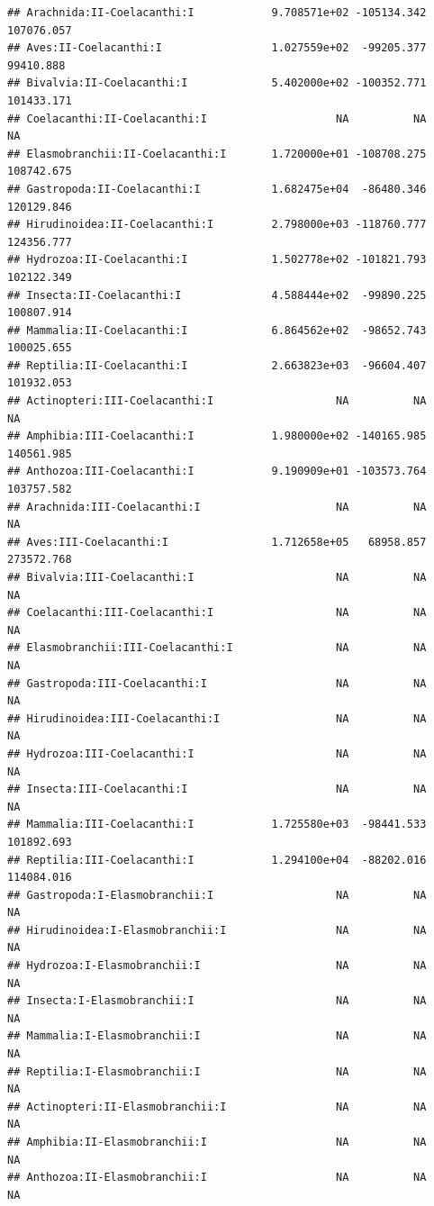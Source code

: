 \documentclass[
  12pt,
]{article}
\begin{document}
\begin{verbatim}
## Arachnida:II-Coelacanthi:I            9.708571e+02 -105134.342  107076.057
## Aves:II-Coelacanthi:I                 1.027559e+02  -99205.377   99410.888
## Bivalvia:II-Coelacanthi:I             5.402000e+02 -100352.771  101433.171
## Coelacanthi:II-Coelacanthi:I                    NA          NA          NA
## Elasmobranchii:II-Coelacanthi:I       1.720000e+01 -108708.275  108742.675
## Gastropoda:II-Coelacanthi:I           1.682475e+04  -86480.346  120129.846
## Hirudinoidea:II-Coelacanthi:I         2.798000e+03 -118760.777  124356.777
## Hydrozoa:II-Coelacanthi:I             1.502778e+02 -101821.793  102122.349
## Insecta:II-Coelacanthi:I              4.588444e+02  -99890.225  100807.914
## Mammalia:II-Coelacanthi:I             6.864562e+02  -98652.743  100025.655
## Reptilia:II-Coelacanthi:I             2.663823e+03  -96604.407  101932.053
## Actinopteri:III-Coelacanthi:I                   NA          NA          NA
## Amphibia:III-Coelacanthi:I            1.980000e+02 -140165.985  140561.985
## Anthozoa:III-Coelacanthi:I            9.190909e+01 -103573.764  103757.582
## Arachnida:III-Coelacanthi:I                     NA          NA          NA
## Aves:III-Coelacanthi:I                1.712658e+05   68958.857  273572.768
## Bivalvia:III-Coelacanthi:I                      NA          NA          NA
## Coelacanthi:III-Coelacanthi:I                   NA          NA          NA
## Elasmobranchii:III-Coelacanthi:I                NA          NA          NA
## Gastropoda:III-Coelacanthi:I                    NA          NA          NA
## Hirudinoidea:III-Coelacanthi:I                  NA          NA          NA
## Hydrozoa:III-Coelacanthi:I                      NA          NA          NA
## Insecta:III-Coelacanthi:I                       NA          NA          NA
## Mammalia:III-Coelacanthi:I            1.725580e+03  -98441.533  101892.693
## Reptilia:III-Coelacanthi:I            1.294100e+04  -88202.016  114084.016
## Gastropoda:I-Elasmobranchii:I                   NA          NA          NA
## Hirudinoidea:I-Elasmobranchii:I                 NA          NA          NA
## Hydrozoa:I-Elasmobranchii:I                     NA          NA          NA
## Insecta:I-Elasmobranchii:I                      NA          NA          NA
## Mammalia:I-Elasmobranchii:I                     NA          NA          NA
## Reptilia:I-Elasmobranchii:I                     NA          NA          NA
## Actinopteri:II-Elasmobranchii:I                 NA          NA          NA
## Amphibia:II-Elasmobranchii:I                    NA          NA          NA
## Anthozoa:II-Elasmobranchii:I                    NA          NA          NA

\end{verbatim}
\end{document}
